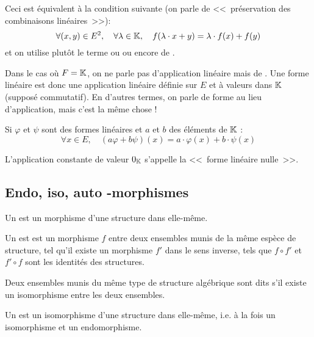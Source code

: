 Ceci est équivalent à la condition suivante  (on parle de <<~préservation des combinaisons
linéaires~>>):
\begin{equation}\colorred
\forall (x,y)\in E^2,\quad \forall \lambda\in\KK,\quad  f(\lambda\cdot x+ y)=\lambda \cdot f(x) + f(y)
\end{equation}
et on utilise plutôt le terme  ou  ou encore de .

\medskip
Dans le cas où $F=\mathbb K$, on ne parle pas d'application linéaire mais de .
Une forme linéaire est donc une application linéaire définie sur $E$ et à valeurs dans $\mathbb K$ (supposé
commutatif).
En d'autres termes, on parle de forme au lieu d'application, mais c'est la même chose !

\medskip
Si $\varphi$ et $\psi$ sont des formes linéaires et $a$ et $b$ des éléments de $\mathbb K$ :
\begin{equation}
    \forall x \in E,\quad (a\varphi + b\psi)(x) = a\cdot \varphi(x) + b\cdot \psi(x)
\end{equation}

\medskip
L'application constante de valeur $0_{\mathbb K}$ s'appelle la <<~forme linéaire nulle~>>.

\medskip
\subsection{Endo, iso, auto -morphismes}

Un  est un morphisme d'une structure dans elle-même.

\medskip
Un  est est un morphisme $f$ entre deux ensembles munis
de la même espèce de structure, tel qu'il existe un morphisme $f'$ dans le sens inverse,
tels que $f\circ f'$ et $f'\circ f$  sont les identités des structures.

Deux ensembles munis du même type de structure algébrique sont dits 
s'il existe un isomorphisme entre les deux ensembles.


\medskip
Un  est un isomorphisme d'une structure dans elle-même,
i.e. à la fois un isomorphisme et un endomorphisme.

